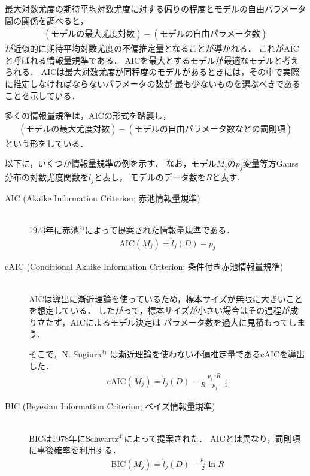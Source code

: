 最大対数尤度の期待平均対数尤度に対する偏りの程度とモデルの自由パラメータ間の関係を調べると，
\begin{align*}
  (モデルの最大尤度対数) - (モデルの自由パラメータ数)
\end{align*}
が近似的に期待平均対数尤度の不偏推定量となることが導かれる．
これがAICと呼ばれる情報量規準である．
AICを最大とするモデルが最適なモデルと考えられる．
AICは最大対数尤度が同程度のモデルがあるときには，その中で実際に推定しなければならないパラメータの数が
最も少ないものを選ぶべきであることを示している．

多くの情報量規準は，AICの形式を踏襲し，
\begin{align*}
  (モデルの最大尤度対数) - (モデルの自由パラメータ数などの罰則項)
\end{align*}
という形をしている．

以下に，いくつか情報量規準の例を示す．
なお，モデル$M_j$の$p_j$変量等方Gauss分布の対数尤度関数を$\hat{l}_j$と表し，
モデルのデータ数を$R$と表す．
\begin{description}
  \item[AIC (Akaike Information Criterion; 赤池情報量規準)]~\\
    1973年に赤池$^{2)}$によって提案された情報量規準である．
    \begin{align}
      \label{eq:aic}
      \mathrm{AIC}(M_j) = \hat{l}_j(D) - p_j
    \end{align}
  \item[cAIC (Conditional Akaike Information Criterion; 条件付き赤池情報量規準)]~\\
    AICは導出に漸近理論を使っているため，標本サイズが無限に大きいことを想定している．
    したがって，標本サイズが小さい場合はその過程が成り立たず，AICによるモデル決定は
    パラメータ数を過大に見積もってしまう．

    そこで，N. Sugiura$^{3)}$ は漸近理論を使わない不偏推定量であるcAICを導出した．
    \begin{align}
      \label{eq:caic}
      \mathrm{cAIC}(M_j) = \hat{l}_j(D) - \frac{p_j \cdot R}{R-p_j-1}
    \end{align}
  \item[BIC (Beyesian Information Criterion; ベイズ情報量規準)]~\\
    BICは1978年にSchwartz$^{4)}$によって提案された．
    AICとは異なり，罰則項に事後確率を利用する．
    \begin{align}
      \label{eq:bic}
      \mathrm{BIC}(M_j) = \hat{l}_j(D) - \frac{p_j}{2}\ln R
    \end{align}
\end{description}

